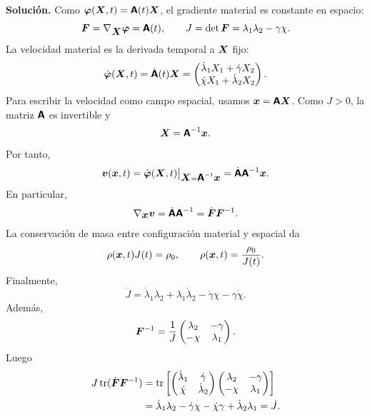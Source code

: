 \documentclass[11pt]{article}
\def\vec   #1{\mbox{\boldmath $#1$}{}}
\def\ten   #1{\mbox{\boldmath $#1$}{}}
\def\mat   #1{\mbox{\boldmath $\mathsf #1$}}
\DeclareMathOperator{\tr}{tr}
\begin{document}
\begin{enumerate}[label=\textbf{\arabic*.}, leftmargin=*]
\begin{enumerate}[label=(\alph*), leftmargin=*]
    \textbf{Solución.} Como $\vec\varphi(\vec X,t)=\mat A(t)\vec X$, el gradiente material es constante en espacio:
    \[
        \ten F=\nabla_{\vec X}\vec\varphi=\mat A(t),
        \qquad
        J=\det\ten F=\lambda_1\lambda_2-\gamma\chi.
    \]
    La velocidad material es la derivada temporal a $\vec X$ fijo:
    \[
        \dot{\vec\varphi}(\vec X,t)=\dot{\mat A}(t)\vec X
        =
        \begin{pmatrix}
            \dot\lambda_1X_1+\dot\gamma X_2\\
            \dot\chi X_1+\dot\lambda_2X_2
        \end{pmatrix}.
    \]
    Para escribir la velocidad como campo espacial, usamos $\vec x=\mat A\vec X$. Como $J>0$, la matriz $\mat A$ es invertible y
    \[
        \vec X=\mat A^{-1}\vec x.
    \]
    Por tanto,
    \[
        \vec v(\vec x,t)=\dot{\vec\varphi}(\vec X,t)\big|_{\vec X=\mat A^{-1}\vec x}
        =\dot{\mat A}\mat A^{-1}\vec x.
    \]
    En particular,
    \[
        \nabla_{\vec x}\vec v=\dot{\mat A}\mat A^{-1}=\dot{\ten F}\ten F^{-1}.
    \]
    La conservación de masa entre configuración material y espacial da
    \[
        \rho(\vec x,t)J(t)=\rho_0,
        \qquad
        \rho(\vec x,t)=\frac{\rho_0}{J(t)}.
    \]
    Finalmente,
    \[
        \dot J=\dot\lambda_1\lambda_2+
        \lambda_1\dot\lambda_2-
        \dot\gamma\chi-
        \gamma\dot\chi.
    \]
    Además,
    \[
        \ten F^{-1}=\frac1J
        \begin{pmatrix}
            \lambda_2&-\gamma\\
            -\chi&\lambda_1
        \end{pmatrix}.
    \]
    Luego
    \[
    \begin{aligned}
        J\tr(\dot{\ten F}\ten F^{-1})
        &=
        \tr\left[
        \begin{pmatrix}
            \dot\lambda_1&\dot\gamma\\
            \dot\chi&\dot\lambda_2
        \end{pmatrix}
        \begin{pmatrix}
            \lambda_2&-\gamma\\
            -\chi&\lambda_1
        \end{pmatrix}
        \right]\\
        &=
        \dot\lambda_1\lambda_2-
        \dot\gamma\chi-
        \dot\chi\gamma+
        \dot\lambda_2\lambda_1
        =\dot J.
    \end{aligned}
    \]


\end{enumerate}
\end{enumerate}
\end{document}
